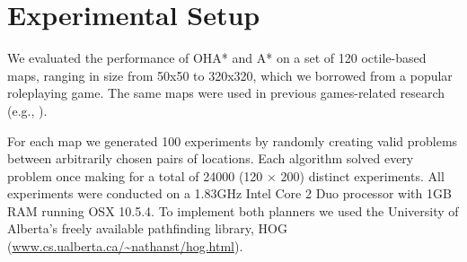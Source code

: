 \section{Experimental Setup}
We evaluated the performance of OHA* and A* on a set of 120 octile-based maps, ranging in size from 50x50 to 320x320, which we borrowed from a popular roleplaying game.
The same maps were used in previous games-related research (e.g., \cite{botea04}).

For each map we generated 100 experiments by randomly creating valid problems between arbitrarily chosen pairs of locations.
Each algorithm solved every problem once making for a total of 24000 (120 $\times$ 200) distinct experiments.
All experiments were conducted on a 1.83GHz Intel Core 2 Duo processor with 1GB RAM running OSX 10.5.4.
To implement both planners we used the University of Alberta's freely available pathfinding library, HOG (\url{www.cs.ualberta.ca/~nathanst/hog.html}). 
